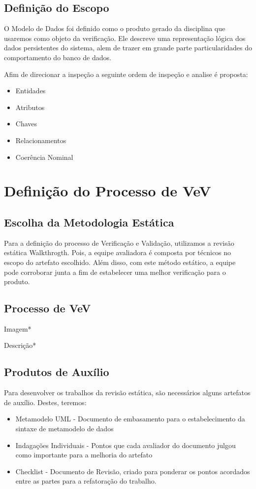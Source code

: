 \subsection{Definição do Escopo}
O Modelo de Dados foi definido como o produto gerado da disciplina que usaremos como objeto da verificação. Ele descreve uma representação lógica dos dados persistentes do sistema, alem de trazer em grande parte particularidades do comportamento do banco de dados.\cite{e04} 

Afim de direcionar a inspeção a seguinte ordem de inspeção e analise é proposta:

\begin{itemize}
\item Entidades
\item Atributos
\item Chaves
\item Relacionamentos
\item Coerência Nominal
\end{itemize}

\section{Definição do Processo de VeV}
\subsection{Escolha da Metodologia Estática}
Para a definição do processo de Verificação e Validação, utilizamos a revisão
estática Walkthrogth. Pois,  a equipe avaliadora é composta por técnicos no escopo
do artefato escolhido. Além disso, com este método estático, a equipe pode corroborar
junta a fim de estabelecer uma melhor verificação para o produto.

\subsection{Processo de VeV}
Imagem*

Descrição*

\subsection{Produtos de Auxílio}
Para desenvolver os trabalhos da revisão estática, são necessários alguns artefatos
de auxílio. Destes, teremos:

\begin{itemize}
\item Metamodelo UML - Documento de embasamento para o estabelecimento da sintaxe
de metamodelo de dados
\item Indagações Individuais - Pontos que cada avaliador do documento julgou como
importante para a melhoria do artefato
\item Checklist - Documento de Revisão, criado para ponderar os pontos acordados
entre as partes para a refatoração do trabalho.
\end{itemize}

